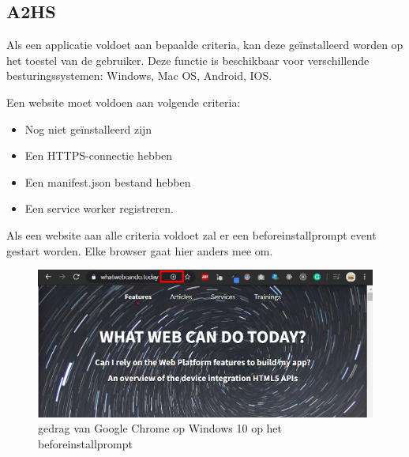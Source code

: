 \subsection{A2HS}
	
	Als een applicatie voldoet aan bepaalde criteria, kan deze geïnstalleerd worden op het toestel van de gebruiker. Deze functie is beschikbaar voor verschillende besturingssystemen: Windows, Mac OS, Android, IOS.
	
	Een website moet voldoen aan volgende criteria:
	
	\begin{itemize}
		\item	Nog niet geïnstalleerd zijn
		\item	Een HTTPS-connectie hebben
		\item	Een manifest.json bestand hebben
		\item	Een service worker registreren.
	\end{itemize}
	
	Als een website aan alle criteria voldoet zal er een beforeinstallprompt event gestart worden. Elke browser gaat hier anders mee om. 
	
	\begin{figure}[!htb]
		\centering
		\includegraphics{./img/beforeinstallprompt_windows.png}	
		\caption{gedrag van Google Chrome op Windows 10 op het beforeinstallprompt}
	\end{figure}
	
